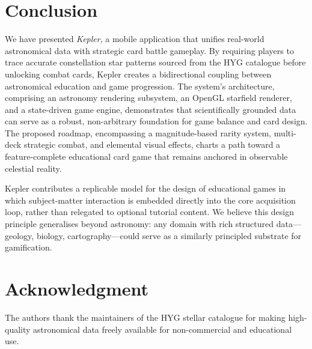 \documentclass[conference]{IEEEtran}
\begin{document}
\section{Conclusion}
\label{sec:conclusion}

We have presented \textit{Kepler}, a mobile application that unifies real-world astronomical data with strategic card battle gameplay. By requiring players to trace accurate constellation star patterns sourced from the HYG catalogue before unlocking combat cards, Kepler creates a bidirectional coupling between astronomical education and game progression. The system's architecture, comprising an astronomy rendering subsystem, an OpenGL starfield renderer, and a state-driven game engine, demonstrates that scientifically grounded data can serve as a robust, non-arbitrary foundation for game balance and card design. The proposed roadmap, encompassing a magnitude-based rarity system, multi-deck strategic combat, and elemental visual effects, charts a path toward a feature-complete educational card game that remains anchored in observable celestial reality.

Kepler contributes a replicable model for the design of educational games in which subject-matter interaction is embedded directly into the core acquisition loop, rather than relegated to optional tutorial content. We believe this design principle generalises beyond astronomy: any domain with rich structured data---geology, biology, cartography---could serve as a similarly principled substrate for gamification.

\section*{Acknowledgment}
The authors thank the maintainers of the HYG stellar catalogue for making high-quality astronomical data freely available for non-commercial and educational use.
\end{document}
